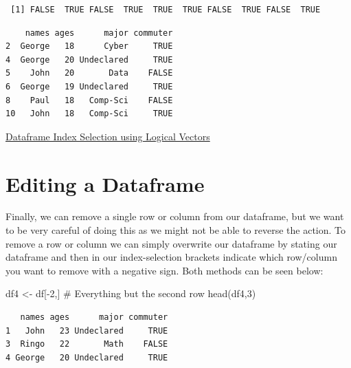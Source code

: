\documentclass[
  letterpaper,
  DIV=11,
  numbers=noendperiod]{scrreprt}
\newenvironment{Shaded}{\begin{snugshade}}{\end{snugshade}}
\newcommand{\CommentTok}[1]{\textcolor[rgb]{0.37,0.37,0.37}{#1}}
\newcommand{\DecValTok}[1]{\textcolor[rgb]{0.68,0.00,0.00}{#1}}
\newcommand{\FunctionTok}[1]{\textcolor[rgb]{0.28,0.35,0.67}{#1}}
\newcommand{\NormalTok}[1]{\textcolor[rgb]{0.00,0.23,0.31}{#1}}
\newcommand{\OtherTok}[1]{\textcolor[rgb]{0.00,0.23,0.31}{#1}}
\newcommand{\SpecialCharTok}[1]{\textcolor[rgb]{0.37,0.37,0.37}{#1}}
\begin{document}
\begin{verbatim}
 [1] FALSE  TRUE FALSE  TRUE  TRUE  TRUE FALSE  TRUE FALSE  TRUE
\end{verbatim}

\begin{Shaded}
\end{Shaded}

\begin{verbatim}
    names ages      major commuter
2  George   18      Cyber     TRUE
4  George   20 Undeclared     TRUE
5    John   20       Data    FALSE
6  George   19 Undeclared     TRUE
8    Paul   18   Comp-Sci    FALSE
10   John   18   Comp-Sci     TRUE
\end{verbatim}

\begin{watch}{}{}
    \href{https://youtu.be/hksRGX-YT6w}{Dataframe Index Selection using Logical Vectors}
\end{watch}

\section{Editing a Dataframe}\label{editing-a-dataframe}

Finally, we can remove a single row or column from our dataframe, but we
want to be very careful of doing this as we might not be able to reverse
the action. To remove a row or column we can simply overwrite our
dataframe by stating our dataframe and then in our index-selection
brackets indicate which row/column you want to remove with a negative
sign. Both methods can be seen below:

\begin{Shaded}
\begin{Highlighting}[]
\NormalTok{df4 }\OtherTok{\textless{}{-}}\NormalTok{ df[}\SpecialCharTok{{-}}\DecValTok{2}\NormalTok{,] }\CommentTok{\# Everything but the second row}
\FunctionTok{head}\NormalTok{(df4,}\DecValTok{3}\NormalTok{)}
\end{Highlighting}
\end{Shaded}

\begin{verbatim}
   names ages      major commuter
1   John   23 Undeclared     TRUE
3  Ringo   22       Math    FALSE
4 George   20 Undeclared     TRUE
\end{verbatim}
\end{document}
